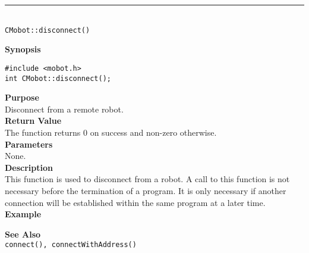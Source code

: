 \noindent
\vspace{5pt}
\rule{4.5in}{0.015in}\\
\noindent
{\LARGE \texttt{CMobot::disconnect()}}\\
{}

\noindent
{\bf Synopsis}
\vspace{-8pt}
\begin{verbatim}
#include <mobot.h>
int CMobot::disconnect();
\end{verbatim}

\noindent
{\bf Purpose}\\
Disconnect from a remote robot.\\

\noindent
{\bf Return Value}\\
The function returns 0 on success and non-zero otherwise.\\

\noindent
{\bf Parameters}\\
None.\\

\noindent
{\bf Description}\\
This function is used to disconnect from a robot. A call to this function is
not necessary before the termination of a program. It is only necessary if
another connection will be established within the same program at a later time.
\\

\noindent
{\bf Example}\\
\noindent

\noindent
{\bf See Also}\\
\texttt{connect(), connectWithAddress()}

